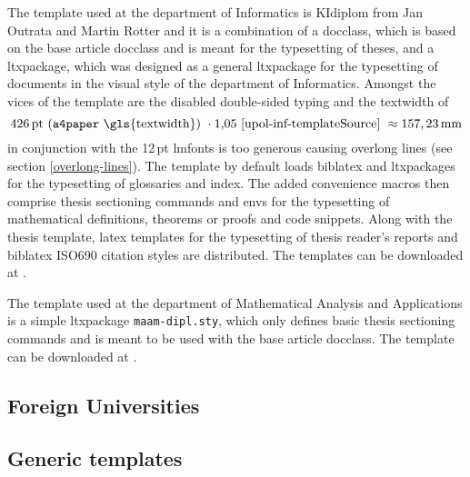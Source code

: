      The template used at the department of Informatics is KIdiplom from Jan Outrata and Martin Rotter and it is a combination of a \gls{docclass}, which is based on the base article \gls{docclass} and is meant for the typesetting of theses, and a \gls{ltxpackage}, which was designed as a general \gls{ltxpackage} for the typesetting of documents in the visual style of the department of Informatics. Amongst the vices of the template are the disabled double-sided typing \cite[lines~69--72]{upol-inf-templateSource} and the \gls{textwidth} of\begin{equation}
    426\text{\,pt}\text{ (\texttt{a4paper} \gls{textwidth}) }\cdot1{,}05\text{ \cite[line~81]{upol-inf-templateSource} }\approx157,23\text{\,mm}
  \end{equation} in conjunction with the 12\,pt \gls{lmfonts} is too generous \cite[lines~74--82]{upol-inf-templateSource} causing overlong lines (see section \ref{overlong-lines}). The template by default loads \gls{biblatex} and \glspl{ltxpackage} for the typesetting of glossaries and index. The added convenience macros then comprise thesis sectioning commands and \glspl{env} for the typesetting of mathematical definitions, theorems or proofs and code snippets. Along with the thesis template, \gls{latex} templates for the typesetting of thesis reader's reports  and \gls{biblatex} ISO\hyph{}690 \cite{iso690-1,iso690-2} citation styles \pending{} are distributed. The templates can be downloaded at \cite{upol-inf-template}.
    
  The template used at the department of Mathematical Analysis and Applications is a simple \gls{ltxpackage} \texttt{maam-dipl.sty}, which only defines basic thesis sectioning commands and is meant to be used with the base article \gls{docclass}. The template can be downloaded at \cite{upol-maam-template}.

  \subsection{Foreign Universities}
  \subsection{Generic templates}


